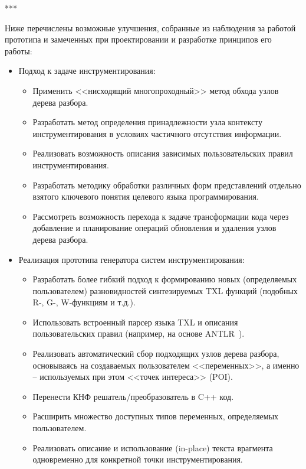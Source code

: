 ***

Ниже перечислены возможные улучшения, собранные из наблюдения за работой прототипа и замеченных при проектировании и разработке принципов его работы:

\begin{itemize}[noitemsep]
  \item Подход к задаче инструментирования:
    \begin{itemize}[noitemsep]
        \item Применить <<нисходящий многопроходный>> метод обхода узлов дерева разбора.
        \item Разработать метод определения принадлежности узла контексту инструментирования в условиях частичного отсутствия информации.
        \item Реализовать возможность описания зависимых пользовательских правил инструментирования.
        \item Разработать методику обработки различных форм представлений отдельно взятого ключевого понятия целевого языка программирования.
        \item Рассмотреть возможность перехода к задаче трансформации кода через добавление и планирование операций обновления и удаления узлов дерева разбора.
    \end{itemize}

  \item Реализация прототипа генератора систем инструментирования:
    \begin{itemize}[noitemsep]
      \item Разработать более гибкий подход к формированию новых (определяемых пользователем) разновидностей синтезируемых TXL функций (подобных R-, G-, W-функциям и т.д.).
      \item Использовать встроенный парсер языка TXL и описания пользовательских правил (например, на основе ANTLR~\cite{antlr}).
      \item Реализовать автоматический сбор подходящих узлов дерева разбора, основываясь на создаваемых пользователем <<переменных>>, а именно -- используемых при этом <<точек интереса>> (POI).
      \item Перенести КНФ решатель/преобразователь в C++ код.
      \item Расширить множество доступных типов переменных, определяемых пользователем.
      \item Реализовать описание и использование (in-place) текста врагмента одновременно для конкретной точки инструментирования.
    \end{itemize}
\end{itemize}

